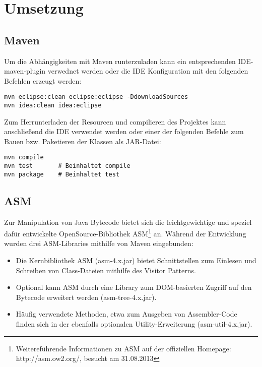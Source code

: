 
\chapter{Umsetzung}

\section{Maven}

Um die Abhängigkeiten mit Maven runterzuladen kann ein entsprechenden IDE-maven-plugin
verwednet werden oder die IDE Konfiguration mit den folgenden Befehlen erzeugt werden:

\begin{lstlisting}[basicstyle=\ttfamily,backgroundcolor=\color{source}]
mvn eclipse:clean eclipse:eclipse -DdownloadSources
mvn idea:clean idea:eclipse
\end{lstlisting}

\vspace{0.3cm}

Zum Herrunterladen der Resourcen und compilieren des Projektes kann
anschließend die IDE verwendet werden oder einer der folgenden Befehle
zum Bauen bzw. Paketieren der Klassen als JAR-Datei:

\begin{lstlisting}[basicstyle=\ttfamily,backgroundcolor=\color{source}]
mvn compile
mvn test       # Beinhaltet compile
mvn package    # Beinhaltet test
\end{lstlisting}

\vspace{0.3cm}

\section{ASM}

Zur Manipulation von Java Bytecode bietet sich die leichtgewichtige und speziel
dafür entwickelte OpenSource-Bibliothek ASM\footnote{Weitereführende Informationen zu ASM auf der offiziellen Homepage: http://asm.ow2.org/, besucht am 31.08.2013} an. Während der Entwicklung wurden
drei ASM-Libraries mithilfe von Maven eingebunden:

\begin{itemize}
\item Die Kernbibliothek ASM (asm-4.x.jar) bietet Schnittstellen zum Einlesen und Schreiben
		von Class-Dateien mithilfe des Visitor Patterns.
\item Optional kann ASM durch eine Library zum DOM-basierten Zugriff auf den
		Bytecode erweitert werden (asm-tree-4.x.jar).
\item Häufig verwendete Methoden, etwa zum Ausgeben von Assembler-Code finden
		sich in der ebenfalls optionalen Utility-Erweiterung (asm-util-4.x.jar).
\end{itemize}


